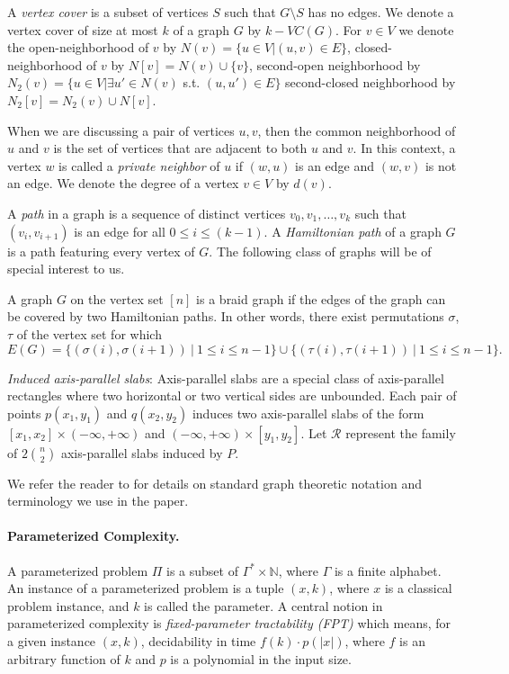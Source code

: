\documentclass[svgnames]{llncs}
\newcommand{\braid}{braid}
\newcommand{\Braid}{Braid}
\begin{document}
A \emph{vertex cover} is a subset of vertices $S$ such that $G \setminus S$ has no edges. We denote a vertex cover of size at most $k$ of a graph 
$G$ by $k-VC(G)$. For $v \in V$ we denote the open-neighborhood of $v$ by $N(v)=\{u \in V \lvert (u,v)\in E\}$,
closed-neighborhood of $v$ by $N[v]=N(v)\cup \{v\}$, second-open neighborhood by $N_2(v)=\{u \in V \lvert \exists u' \in N(v)$ s.t. $(u,u')\in E\}$
second-closed neighborhood by $N_2[v]=N_2(v)\cup N[v]$.

When we are discussing a pair of vertices $u,v$, then the common neighborhood of $u$ and $v$ is the set of vertices that are adjacent to both $u$ and $v$. 
In this context, a vertex $w$ is called a \emph{private neighbor} of $u$ if $(w,u)$ is an edge and $(w,v)$ is not an edge. We denote the degree of a vertex $v \in V$ by $d(v)$.

A \emph{path} in a graph is a sequence of distinct vertices $v_0, v_1, \ldots, v_k$ such that $(v_i,v_{i+1})$ is an edge for all $0 \leq i \leq (k-1)$.
A \emph{Hamiltonian path} of a graph $G$ is a path featuring every vertex of $G$. The following class of graphs will be of special interest to us.

\begin{definition}[\Braid{} graphs]
A graph $G$ on the vertex set $[n]$ is a \braid{} graph if the edges of the graph can be covered by two Hamiltonian paths. In other words, there exist permutations $\sigma$, $\tau$ of the vertex set for 
which $E(G) = \{(\sigma(i),\sigma(i+1)) ~|~  1 \leq i \leq n-1\} \cup \{(\tau(i),\tau(i+1)) ~|~  1 \leq i \leq n-1\}.$ 
\end{definition}



{\em Induced axis-parallel slabs}: Axis-parallel slabs are a special class
of axis-parallel rectangles where two horizontal or two vertical sides are
unbounded. Each pair of points $p(x_1,y_1)$ and $q(x_2,y_2)$ induces two
axis-parallel slabs of the form $[x_1,x_2]\times (-\infty,+\infty)$ and
$(-\infty,+\infty)\times [y_1,y_2]$. Let $\mathcal{R}$ represent the
family of $2 {n\choose 2}$ axis-parallel slabs induced by $P$.





We refer the reader to \cite{graphbook} for details on standard graph theoretic notation and terminology we use in the paper. 

\paragraph{Parameterized Complexity.} A parameterized problem $\Pi$ is a subset of $\Gamma^{*}\times
\mathbb{N}$, where $\Gamma$ is a finite alphabet. An instance of a
parameterized problem is a tuple $(x,k)$, where $x$ is a classical problem instance, 
and $k$ is called the parameter. A central notion in parameterized complexity is {\em
  fixed-parameter tractability (FPT)} which means, for a given
instance $(x,k)$, decidability in time $f(k)\cdot p(|x|)$, where
$f$ is an arbitrary function of $k$ and $p$ is a polynomial in the
input size. 
\end{document}
